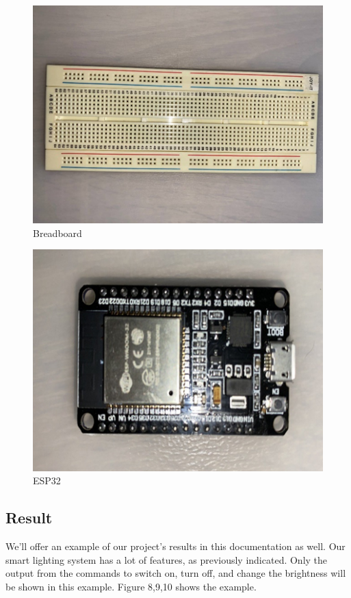 \begin{figure}[htbp]
\centerline{\includegraphics{image4.png}}
\caption{Breadboard}
\label{fig}
\end{figure}

\begin{figure}[htbp]
\centerline{\includegraphics{image5.png}}
\caption{ESP32}
\label{fig}
\end{figure}



\subsection{Result}

We'll offer an example of our project's results in this documentation as well. Our smart lighting system has a lot of features, as previously indicated. Only the output from the commands to switch on, turn off, and change the brightness will be shown in this example. Figure 8,9,10 shows the example.


